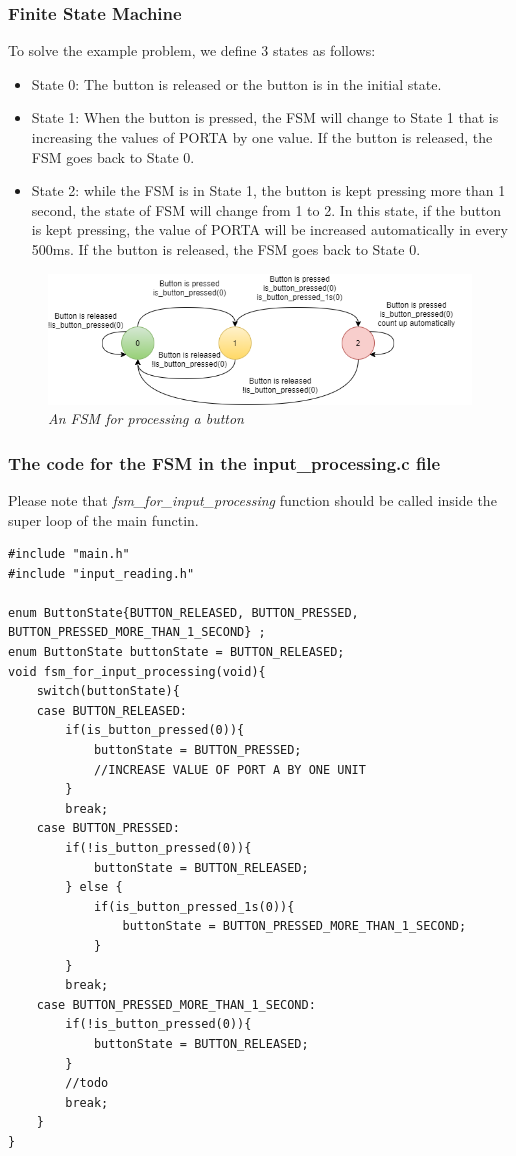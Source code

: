 \subsubsection {Finite State Machine}
To solve the example problem, we define 3 states as follows:
\begin{itemize}
    \item State 0: The button is released or the button is in the initial state. 
    \item State 1: When the button is pressed, the FSM will change to State 1 that is increasing the values of PORTA by one value. If the button is released, the FSM goes back to State 0.
    \item State 2: while the FSM is in State 1, the button is kept pressing more than 1 second, the state of FSM will change from 1 to 2. In this state, if the button is kept pressing, the value of PORTA will be increased automatically in every 500ms. If the button is released, the FSM goes back to State 0.
\end{itemize}
\begin{figure}[!htp]
    \centering
    \includegraphics[width=5.5in]{source/picture/bai_3/fsm.png}
    \caption{\textit{An FSM for processing a button}}
    \label{bai4_pic_fsm_for_button_processing}
\end{figure}
\newpage
\subsubsection{The code for the FSM in the input\_processing.c file}
Please note that \emph{fsm\_for\_input\_processing} function should be called inside the super loop of the main functin. 
\begin{lstlisting}[caption=The code in the input\_processing.c file]
#include "main.h"
#include "input_reading.h"

enum ButtonState{BUTTON_RELEASED, BUTTON_PRESSED, BUTTON_PRESSED_MORE_THAN_1_SECOND} ;
enum ButtonState buttonState = BUTTON_RELEASED;
void fsm_for_input_processing(void){
	switch(buttonState){
	case BUTTON_RELEASED:
		if(is_button_pressed(0)){
			buttonState = BUTTON_PRESSED;
			//INCREASE VALUE OF PORT A BY ONE UNIT
		}
		break;
	case BUTTON_PRESSED:
		if(!is_button_pressed(0)){
			buttonState = BUTTON_RELEASED;
		} else {
			if(is_button_pressed_1s(0)){
				buttonState = BUTTON_PRESSED_MORE_THAN_1_SECOND;
			}
		}
		break;
	case BUTTON_PRESSED_MORE_THAN_1_SECOND:
		if(!is_button_pressed(0)){
			buttonState = BUTTON_RELEASED;
		}
		//todo
		break;
	}
}
\end{lstlisting}
